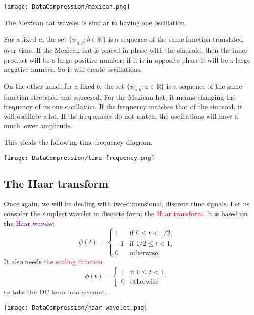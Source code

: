 \documentclass[a4paper, 11pt, openany]{book}
\numberwithin{equation}{section}
\theoremstyle{plain}
\theoremstyle{definition}
\newcommand{\R}{\mathbb{R}}
\newcommand{\Important}[1]{\textcolor{red}{#1}}
\newcommand{\Define}[1]{\textcolor{purple}{#1}}
\begin{document}
\begin{center}
\texttt{[image: DataCompression/mexican.png]}
\end{center}

The Mexican hat wavelet is similar to having one oscillation.


For a fixed $a$, the set $\{ \psi_{a,b} : b \in \R \}$ is a sequence of the same function translated over time. If the Mexican hat is placed in phase with the sinusoid, then the inner product will be a large positive number; if it is in opposite phase it will be a large negative number. So it will create oscillations.

On the other hand, for a fixed $b$, the set $\{ \psi_{a,b} : a \in \R \}$ is a sequence of the same function stretched and squeezed. For the Mexican hat, it means changing the frequency of its one oscillation. If the frequency matches that of the sinusoid, it will oscillate a lot. If the frequencies do not match, the oscillations will have a much lower amplitude.

This yields the following time-frequency diagram.

\begin{center}
\texttt{[image: DataCompression/time-frequency.png]}
\end{center}

\subsection{The Haar transform}

Once again, we will be dealing with two-dimensional, discrete time signals. Let us consider the simplest wavelet in discrete form: the \Important{Haar transform}. It is based on the \Define{Haar wavelet}
\[
    \psi(t) = \begin{cases}
    1 & \text{if } 0 \le t < 1/2,\\
    -1 & \text{if } 1/2 \le t < 1,\\
    0 & \text{otherwise.}
    \end{cases}
\]
It also needs the \Important{scaling function}
\[
    \phi(t) = \begin{cases}
    1 & \text{if } 0 \le t < 1,\\
    0 & \text{otherwise}
    \end{cases}
\]
to take the DC term into account.

\begin{center}
\texttt{[image: DataCompression/haar\_wavelet.png]}
\end{center}
\end{document}
